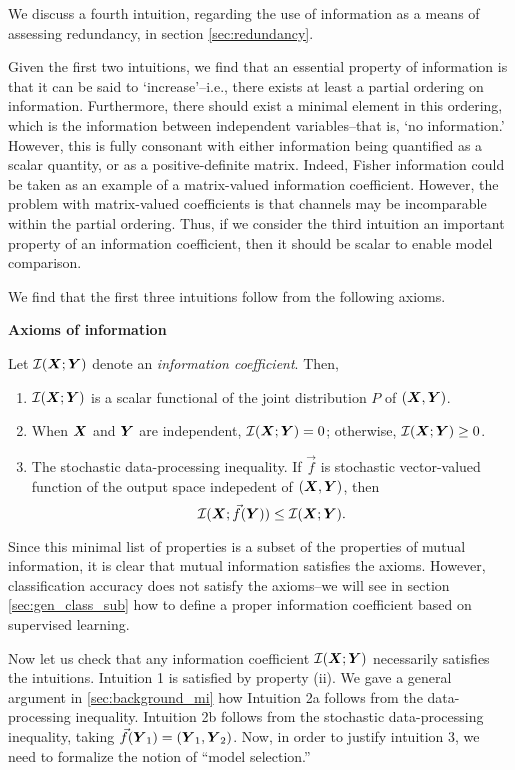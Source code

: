 \documentclass[12pt]{article}
\begin{document}
We discuss a fourth intuition, regarding the use of information as a
means of assessing redundancy, in section \ref{sec:redundancy}.

Given the first two intuitions, we find that an essential property of
information is that it can be said to `increase'--i.e., there exists
at least a partial ordering on information.  Furthermore, there should
exist a minimal element in this ordering, which is the information
between independent variables--that is, `no information.' However,
this is fully consonant with either information being quantified as a
scalar quantity, or as a positive-definite matrix.  Indeed, Fisher
information could be taken as an example of a matrix-valued
information coefficient.  However, the problem with matrix-valued
coefficients is that channels may be incomparable within the partial
ordering.  Thus, if we consider the third intuition an important
property of an information coefficient, then it should be scalar to
enable model comparison.

We find that the first three intuitions follow from the following
axioms.

\noindent\textbf{Axioms of information}

Let $\mathcal{I}(\boldsymbol{X}; \boldsymbol{Y})$ denote an \emph{information coefficient}.
Then,
\begin{enumerate}
\item $\mathcal{I}(\boldsymbol{X}; \boldsymbol{Y})$ is a scalar functional of the joint distribution $P$ of $(\boldsymbol{X}, \boldsymbol{Y})$.
\item When $\boldsymbol{X}$ and $\boldsymbol{Y}$ are independent, $\mathcal{I}(\boldsymbol{X}; \boldsymbol{Y}) = 0$; otherwise, $\mathcal{I}(\boldsymbol{X}; \boldsymbol{Y}) \geq 0$.
\item 
The stochastic data-processing inequality.  If $\vec{f}$ is stochastic
vector-valued function of the output space indepedent of $(\boldsymbol{X}, \boldsymbol{Y})$,
then
\[
\mathcal{I}(\boldsymbol{X}; \vec{f}(\boldsymbol{Y})) \leq \mathcal{I}(\boldsymbol{X}; \boldsymbol{Y}).
\]
\end{enumerate}

Since this minimal list of properties is a subset of the properties of
mutual information, it is clear that mutual information satisfies the
axioms.  However, classification accuracy does not satisfy the
axioms--we will see in section \ref{sec:gen_class_sub} how to define
a proper information coefficient based on supervised learning.

Now let us check that any information coefficient
$\mathcal{I}(\boldsymbol{X}; \boldsymbol{Y})$ necessarily satisfies the intuitions.
Intuition 1 is satisfied by property (ii).  We gave a general argument
in \ref{sec:background_mi} how Intuition 2a follows from the
data-processing inequality.  Intuition 2b follows from the stochastic
data-processing inequality, taking $\vec{f}(\boldsymbol{Y}_1) = (\boldsymbol{Y}_1, \boldsymbol{Y}_2)$.
Now, in order to justify intuition 3, we need to formalize the notion
of ``model selection.''
\end{document}
